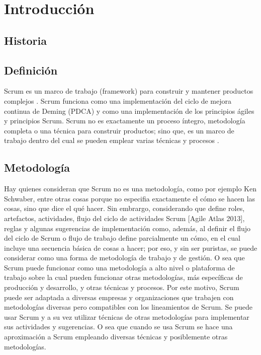 \chapter{Introducción}

\section{Historia}

\section{Definición}

Scrum es un marco de trabajo  (framework) para construir y mantener productos complejos \cite{SBOK-2013} \cite{Scrum-Alliance-2015}. 
Scrum funciona como una implementación del ciclo de mejora continua de Deming (PDCA) y como una implementación de los principios ágiles y principios Scrum. 
Scrum no es exactamente un proceso íntegro, metodología completa o una técnica para construir productos; 
sino que, es un marco de trabajo dentro del cual se pueden emplear varias técnicas y procesos \cite{Agile-Atlas-2012}. 

\section{Metodología}

Hay quienes consideran que Scrum no es una metodología, como por ejemplo Ken Schwaber, entre otras cosas porque no especifia exactamente el cómo se hacen las cosas, sino que dice el qué hacer. Sin embrargo, considerando que define roles, artefactos, actividades, flujo del ciclo de actividades Scrum [Agile Atlas 2013], reglas y algunas sugerencias de implementación como, además, al definir el flujo del ciclo de Scrum o flujo de trabajo define parcialmente un cómo, en el cual incluye una secuencia básica de cosas a hacer; por eso, y sin ser puristas, se puede considerar como una forma de metodología de trabajo y de gestión. O sea que Scrum puede funcionar como una metodología a alto nivel o plataforma de trabajo sobre la cual pueden funcionar otras metodologías, más específicas de producción y desarrollo, y otras técnicas y procesos. Por este motivo, Scrum puede ser adaptada a diversas empresas y organizaciones que trabajen con metodologías diversas pero compatibles con los lineamientos de Scrum. Se puede usar Scrum y a su vez utilizar técnicas de otras metodologías para implementar sus actividades y sugerencias. O sea que cuando se usa Scrum se hace una aproximación a Scrum empleando diversas técnicas y posiblemente otras metodologías.

